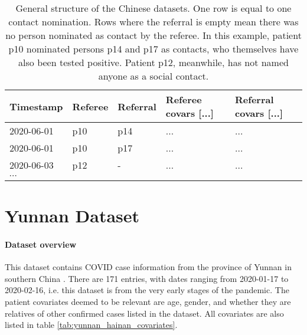\begin{table}
	\begin{tabularx}{\linewidth}{XXXXX}
		\hline
		\textbf{Timestamp} & \textbf{Referee} & \textbf{Referral} & \textbf{Referee covars [...]} & \textbf{Referral covars [...]} \\
		\hline
		2020-06-01 & p10 & p14 & ... & ... \\
		2020-06-01 & p10 & p17 & ... & ... \\
		2020-06-03 & p12 & - & ... & ... \\
		$\cdots$ & & & & \\
	\end{tabularx}
	\caption{General structure of the Chinese datasets. One row is equal to one contact nomination. Rows where the referral is empty mean there was no person nominated as contact by the referee. In this example, patient p10 nominated persons p14 and p17 as contacts, who themselves have also been tested positive. Patient p12, meanwhile, has not named anyone as a social contact.}
	\label{tab:china_data_structure}
\end{table}

\section{Yunnan Dataset}
\label{sec:yunnan_data}

\paragraph{Dataset overview} This dataset contains COVID case information from the province of Yunnan in southern China \cite{hainan_data}. There are 171 entries, with dates ranging from 2020-01-17 to 2020-02-16, i.e. this dataset is from the very early stages of the pandemic. The patient covariates deemed to be relevant are age, gender, and whether they are relatives of other confirmed cases listed in the dataset. All covariates are also listed in table \ref{tab:yunnan_hainan_covariates}.

